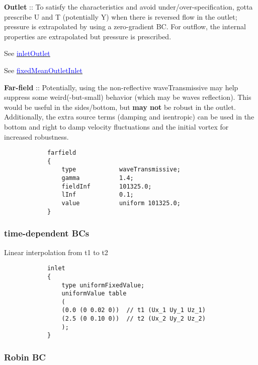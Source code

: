 \documentclass[a4paper, 12pt]{article}
\numberwithin{equation}{section}
\newcommand{\code}{\fontfamily{pcr}\selectfont}
\newcommand{\blue}[1]{\textcolor{blue}{#1}}
\begin{document}
            \textbf{Outlet} :: To satisfy the characteristics and avoid under/over-specification, gotta prescribe U and T (potentially Y) when there is reversed flow in the outlet; pressure is extrapolated by using a zero-gradient BC. For outflow, the internal properties are extrapolated but pressure is prescribed.

            See \href{
            https://doc.openfoam.com/2306/tools/processing/boundary-conditions/rtm/derived/inletOutlet/inletOutlet/
            }{\blue{inletOutlet}}

            See \href{
            https://doc.openfoam.com/2306/tools/processing/boundary-conditions/rtm/derived/inletOutlet/fixedMeanOutletInlet/
            }{\blue{fixedMeanOutletInlet}}

            \textbf{Far-field} :: Potentially, using the non-reflective {\code waveTransmissive} may help suppress some weird(-but-small) behavior (which may be waves reflection). This would be useful in the sides/bottom, but \textbf{may not} be robust in the outlet. Additionally, the extra source terms (damping and isentropic) can be used in the bottom and right to damp velocity fluctuations and the initial vortex for increased robustness.

            {
            \begin{verbatim}
            farfield
            {
                type            waveTransmissive;
                gamma           1.4;
                fieldInf        101325.0;
                lInf            0.1;
                value           uniform 101325.0;
            }
            \end{verbatim}
            }

        \subsubsection{time-dependent BCs}

            Linear interpolation from t1 to t2

            {
            \begin{verbatim}
            inlet
            {
                type uniformFixedValue;
                uniformValue table
                (
                (0.0 (0 0.02 0))  // t1 (Ux_1 Uy_1 Uz_1)
                (2.5 (0 0.10 0))  // t2 (Ux_2 Uy_2 Uz_2)
                );
            }
            \end{verbatim}
            }

        \subsubsection{Robin BC}
\end{document}
